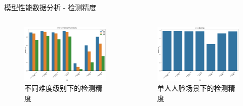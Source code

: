 \documentclass{beamer}
\begin{document}
\begin{frame}{模型性能数据分析 - 检测精度}
    \begin{columns}
        \begin{column}{0.5\textwidth}
            \begin{figure}
                \includegraphics[width=\textwidth]{pic/ap_comparison.png}
                \caption{不同难度级别下的检测精度}
            \end{figure}
        \end{column}
        \begin{column}{0.5\textwidth}
            \begin{figure}
                \includegraphics[width=\textwidth]{pic/one_face_ap.png}
                \caption{单人人脸场景下的检测精度}
            \end{figure}
        \end{column}
    \end{columns}
\end{frame}
\end{document}
